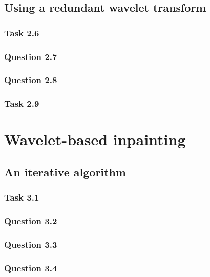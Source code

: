 \documentclass[a4paper]{article}
\begin{document}
    \subsection{Using a redundant wavelet transform}

    \subsubsection{Task 2.6}

    \subsubsection{Question 2.7}

    \subsubsection{Question 2.8}

    \subsubsection{Task 2.9}

    \section{Wavelet-based inpainting}

    \subsection{An iterative algorithm}

    \subsubsection{Task 3.1}

    \subsubsection{Question 3.2}

    \subsubsection{Question 3.3}

    \subsubsection{Question 3.4}

 
\end{document}
